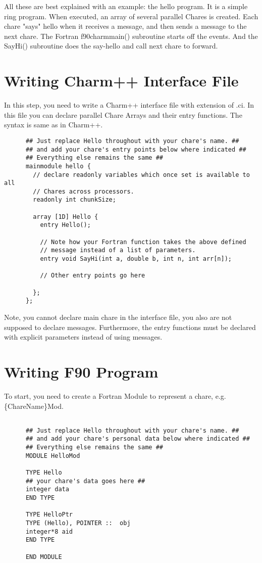 \documentclass[11pt]{article}
\begin{document}
All these are best explained with an example: the hello program.  It is a
simple ring program.  When executed, an array of several parallel
Chares is created.  Each chare "says" hello when it receives a
message, and then sends a message to the next chare. The Fortran f90charmmain() 
subroutine starts off the events.  And the SayHi() subroutine does the 
say-hello and call next chare to forward.

\section{Writing Charm++ Interface File}
In this step, you need to write a Charm++ interface file with extension of
.ci. In this file you can declare parallel Chare Arrays and their entry 
functions. The syntax is same as in Charm++.
\begin{verbatim}
      ## Just replace Hello throughout with your chare's name. ##
      ## and add your chare's entry points below where indicated ##
      ## Everything else remains the same ##
      mainmodule hello {
        // declare readonly variables which once set is available to all
        // Chares across processors.      
        readonly int chunkSize;

        array [1D] Hello {
          entry Hello();

          // Note how your Fortran function takes the above defined
          // message instead of a list of parameters.
          entry void SayHi(int a, double b, int n, int arr[n]);

          // Other entry points go here

        };              
      };
\end{verbatim}
Note, you cannot declare main chare in the interface file, you also are not 
supposed to declare messages. Furthermore, the entry functions must be 
declared with explicit parameters instead of using messages. 

\section{Writing F90 Program}
To start, you need to create a Fortran Module to represent a chare,
e.g. \{ChareName\}Mod.

\begin{verbatim}

      ## Just replace Hello throughout with your chare's name. ##
      ## and add your chare's personal data below where indicated ##
      ## Everything else remains the same ##
      MODULE HelloMod

      TYPE Hello
      ## your chare's data goes here ##
      integer data
      END TYPE

      TYPE HelloPtr
      TYPE (Hello), POINTER ::  obj
      integer*8 aid
      END TYPE

      END MODULE
\end{verbatim}
\end{document}
